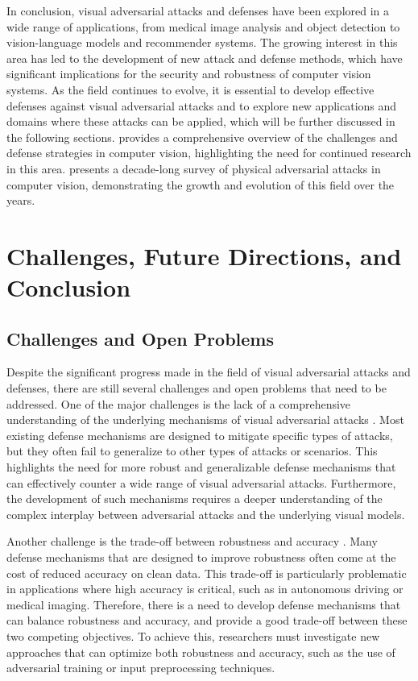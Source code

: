 \documentclass[11pt]{article}
\begin{document}
In conclusion, visual adversarial attacks and defenses have been explored in a wide range of applications, from medical image analysis and object detection to vision-language models and recommender systems. The growing interest in this area has led to the development of new attack and defense methods, which have significant implications for the security and robustness of computer vision systems. As the field continues to evolve, it is essential to develop effective defenses against visual adversarial attacks and to explore new applications and domains where these attacks can be applied, which will be further discussed in the following sections. \cite{ref7} provides a comprehensive overview of the challenges and defense strategies in computer vision, highlighting the need for continued research in this area. \cite{ref142} presents a decade-long survey of physical adversarial attacks in computer vision, demonstrating the growth and evolution of this field over the years.

\section{Challenges, Future Directions, and Conclusion}

\subsection{Challenges and Open Problems}

Despite the significant progress made in the field of visual adversarial attacks and defenses, there are still several challenges and open problems that need to be addressed. One of the major challenges is the lack of a comprehensive understanding of the underlying mechanisms of visual adversarial attacks \cite{ref17}. Most existing defense mechanisms are designed to mitigate specific types of attacks, but they often fail to generalize to other types of attacks or scenarios. This highlights the need for more robust and generalizable defense mechanisms that can effectively counter a wide range of visual adversarial attacks. Furthermore, the development of such mechanisms requires a deeper understanding of the complex interplay between adversarial attacks and the underlying visual models.

Another challenge is the trade-off between robustness and accuracy \cite{ref21}. Many defense mechanisms that are designed to improve robustness often come at the cost of reduced accuracy on clean data. This trade-off is particularly problematic in applications where high accuracy is critical, such as in autonomous driving or medical imaging. Therefore, there is a need to develop defense mechanisms that can balance robustness and accuracy, and provide a good trade-off between these two competing objectives. To achieve this, researchers must investigate new approaches that can optimize both robustness and accuracy, such as the use of adversarial training or input preprocessing techniques.
\end{document}
